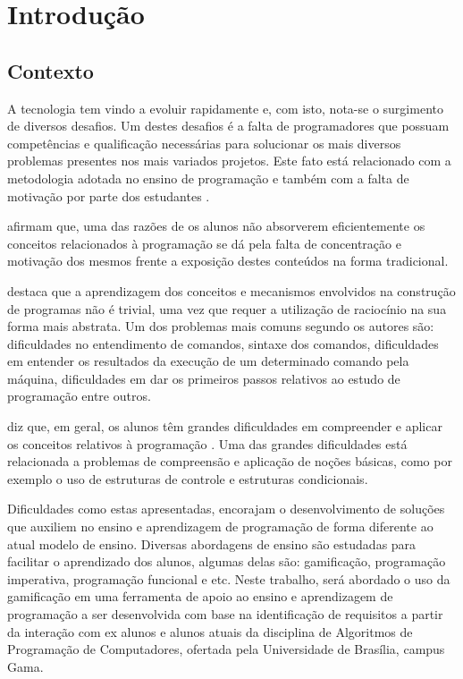 \chapter[Introdução]{Introdução}

\section{Contexto}
A tecnologia tem vindo a evoluir rapidamente e, com isto, nota-se o surgimento de
diversos desafios. Um destes desafios é a falta de programadores que possuam competências 
e qualificação necessárias para solucionar os mais diversos problemas presentes nos mais
variados projetos. Este fato está relacionado com a metodologia adotada no ensino de
programação e também com a falta de motivação por parte dos estudantes \cite{7975788}.

 afirmam que, uma das razões de os alunos não absorverem eficientemente
os conceitos relacionados à programação se dá pela falta de concentração e motivação dos mesmos frente
a exposição destes conteúdos na forma tradicional.

 destaca que a aprendizagem dos conceitos e mecanismos envolvidos na construção de programas não é
trivial, uma vez que requer a utilização de raciocínio na sua forma mais abstrata. Um dos problemas mais comuns segundo os autores
são: dificuldades no entendimento de comandos, sintaxe dos comandos, dificuldades em entender os resultados da execução de um determinado 
comando pela máquina, dificuldades em dar os primeiros passos relativos ao estudo de programação entre outros.

 diz que, em geral, os alunos têm grandes dificuldades em compreender e aplicar os conceitos relativos à programação . Uma das grandes 
dificuldades está relacionada a problemas de compreensão e aplicação de noções básicas, como por exemplo o uso de estruturas de controle e estruturas
condicionais.

Dificuldades como estas apresentadas, encorajam o desenvolvimento de soluções que auxiliem no ensino e aprendizagem de programação de forma diferente ao
atual modelo de ensino. Diversas abordagens de ensino são estudadas para facilitar o aprendizado dos alunos, algumas delas são:
gamificação, programação imperativa, programação funcional e etc. Neste trabalho, será abordado o uso da gamificação em uma ferramenta
de apoio ao ensino e aprendizagem de programação a ser desenvolvida com base na identificação de requisitos a partir da interação com ex alunos
e alunos atuais da disciplina de Algoritmos de Programação de Computadores, ofertada pela Universidade de Brasília, campus Gama.

